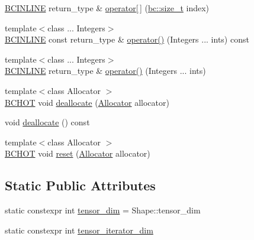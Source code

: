 \begin{DoxyCompactItemize}
\item 
\hyperlink{common_8h_a6699e8b0449da5c0fafb878e59c1d4b1}{B\+C\+I\+N\+L\+I\+NE} return\+\_\+type \& \hyperlink{structbc_1_1tensors_1_1exprs_1_1Kernel__Array_a4189673aa2016bbf745afdb38eaaa4bd}{operator\mbox{[}$\,$\mbox{]}} (\hyperlink{namespacebc_aaf8e3fbf99b04b1b57c4f80c6f55d3c5}{bc\+::size\+\_\+t} index)
\item 
{\footnotesize template$<$class ... Integers$>$ }\\\hyperlink{common_8h_a6699e8b0449da5c0fafb878e59c1d4b1}{B\+C\+I\+N\+L\+I\+NE} const return\+\_\+type \& \hyperlink{structbc_1_1tensors_1_1exprs_1_1Kernel__Array_aaa2ea8d4e5aea0c8969833c2dc2ed0fb}{operator()} (Integers ... ints) const
\item 
{\footnotesize template$<$class ... Integers$>$ }\\\hyperlink{common_8h_a6699e8b0449da5c0fafb878e59c1d4b1}{B\+C\+I\+N\+L\+I\+NE} return\+\_\+type \& \hyperlink{structbc_1_1tensors_1_1exprs_1_1Kernel__Array_a53f0cee4dd8a9775ef56b19b9498072d}{operator()} (Integers ... ints)
\item 
{\footnotesize template$<$class Allocator $>$ }\\\hyperlink{common_8h_ac085f07cc309e3aac24aa3fc0a40f6d2}{B\+C\+H\+OT} void \hyperlink{structbc_1_1tensors_1_1exprs_1_1Kernel__Array_a60aebb03b7b8f71975e0d71d43c37087}{deallocate} (\hyperlink{classbc_1_1allocators_1_1Allocator}{Allocator} allocator)
\item 
void \hyperlink{structbc_1_1tensors_1_1exprs_1_1Kernel__Array_aaa57ddd4b0a9f13a27c80d2ecaf38781}{deallocate} () const
\item 
{\footnotesize template$<$class Allocator $>$ }\\\hyperlink{common_8h_ac085f07cc309e3aac24aa3fc0a40f6d2}{B\+C\+H\+OT} void \hyperlink{structbc_1_1tensors_1_1exprs_1_1Kernel__Array_ae551c5aebb87e199c1473a1c9cfa6605}{reset} (\hyperlink{classbc_1_1allocators_1_1Allocator}{Allocator} allocator)
\end{DoxyCompactItemize}
\subsection*{Static Public Attributes}
\begin{DoxyCompactItemize}
\item 
static constexpr int \hyperlink{structbc_1_1tensors_1_1exprs_1_1Kernel__Array_ae5d17962cb9d81c7e0d205bb8f454d68}{tensor\+\_\+dim} = Shape\+::tensor\+\_\+dim
\item 
static constexpr int \hyperlink{structbc_1_1tensors_1_1exprs_1_1Kernel__Array_ab9c51a920183d5e5a99cd642c76d368f}{tensor\+\_\+iterator\+\_\+dim}
\end{DoxyCompactItemize}
